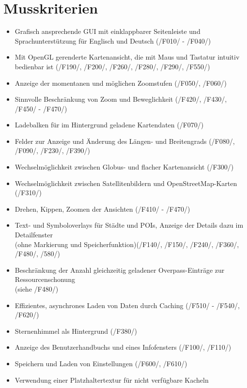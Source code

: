 \documentclass[10pt]{scrreprt}
\newcommand{\ziel}[1]{{\fontsize{9.5}{11}\textsf{/#1/}}}
\begin{document}
\section{Musskriterien}
\begin{itemize}
\item Grafisch ansprechende GUI mit einklappbarer Seitenleiste und\\ Sprachunterstützung für Englisch und Deutsch (\ziel{F010} - \ziel{F040})
\item Mit OpenGL gerenderte Kartenansicht, die mit Maus und Tastatur intuitiv bedienbar ist (\ziel{F190}, \ziel{F200}, \ziel{F260}, \ziel{F280}, \ziel{F290}, \ziel{F550})
\item Anzeige der momentanen und möglichen Zoomstufen (\ziel{F050}, \ziel{F060})
\item Sinnvolle Beschränkung von Zoom und Beweglichkeit (\ziel{F420}, \ziel{F430}, \ziel{F450} - \ziel{F470})
\item Ladebalken für im Hintergrund geladene Kartendaten (\ziel{F070})
\item Felder zur Anzeige und Änderung des Längen- und Breitengrads (\ziel{F080}, \ziel{F090}, \ziel{F230}, \ziel{F390})
\item Wechselmöglichkeit zwischen Globus- und flacher Kartenansicht (\ziel{F300})
\item Wechselmöglichkeit zwischen Satellitenbildern und OpenStreetMap-Karten (\ziel{F310})
\item Drehen, Kippen, Zoomen der Ansichten (\ziel{F410} - \ziel{F470})
\item Text- und Symboloverlays für Städte und POIs, Anzeige der Details dazu im Detailfenster\\(ohne Markierung und Speicherfunktion)(\ziel{F140}, \ziel{F150}, \ziel{F240}, \ziel{F360}, \ziel{F480}, \ziel{580})
\item Beschränkung der Anzahl gleichzeitig geladener Overpass-Einträge zur Ressourcenschonung \\(siehe \ziel{F480})
\item Effizientes, asynchrones Laden von Daten durch Caching (\ziel{F510} - \ziel{F540}, \ziel{F620})
\item Sternenhimmel als Hintergrund (\ziel{F380})
\item Anzeige des Benutzerhandbuchs und eines Infofensters (\ziel{F100}, \ziel{F110})
\item Speichern und Laden von Einstellungen (\ziel{F600}, \ziel{F610})
\item Verwendung einer Platzhaltertextur für nicht verfügbare Kacheln
\end{itemize}
\end{document}
